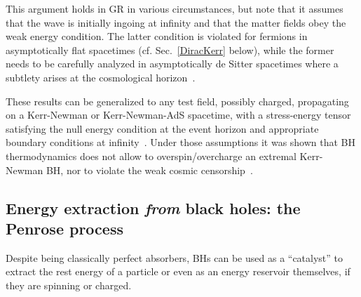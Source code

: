 \documentclass[11pt]{article}
\numberwithin{equation}{section} %
\begin{document}
This argument holds in GR in various circumstances, but note that it assumes that the wave is initially ingoing at infinity
and that the matter fields obey the weak energy condition.
The latter condition is violated for fermions in asymptotically flat spacetimes (cf. Sec.~\ref{DiracKerr} below), while the former
needs to be carefully analyzed in asymptotically de Sitter spacetimes where a subtlety arises at the cosmological horizon~\cite{Tachizawa:1992ue}. 
%

These results can be generalized to any test field, possibly charged, propagating on a Kerr-Newman or 
Kerr-Newman-AdS spacetime, with a stress-energy tensor satisfying the null energy condition at the event horizon and 
appropriate boundary conditions at infinity~\cite{Natario:2016bay}. Under those assumptions it was shown that BH 
thermodynamics does not allow to overspin/overcharge an extremal Kerr-Newman BH, nor to violate the weak cosmic 
censorship~\cite{Natario:2016bay}.

\subsection{Energy extraction {\it from} black holes: the Penrose process}\label{sec:energyextraction}
Despite being classically perfect absorbers, BHs can be used as a ``catalyst'' to extract 
the rest energy of a particle or even as an energy reservoir themselves, if they are spinning or charged.
\end{document}
